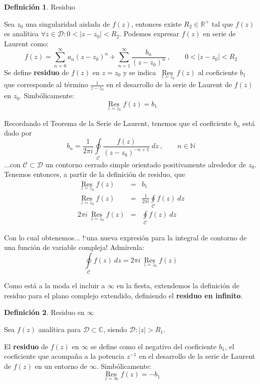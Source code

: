 \documentclass[12pt]{article}
\theoremstyle{definition}
\newtheorem{definition}{Definici\'on}[section]
\theoremstyle{theorem}
\theoremstyle{corolary}
\theoremstyle{method}
\DeclareMathOperator*{\Res}{Res}
\begin{document}
\colorbox{gray!40!white!80}{\parbox{\linewidth}{
\theoremstyle{definition}
\begin{definition}{Residuo}

Sea $z_0$ una singularidad aislada de $f(z)$, entonces existe $R_2\in \mathbb{R}^+$ tal que $f(z)$ es anal\'itica $\forall z \in\mathcal{D}: 0<|z-z_0|<R_2$. Podemos expresar $f(z)$ en serie de Laurent como: $$f(z)=\sum\limits_{n=0}^{\infty}a_n(z-z_0)^n + \sum\limits_{n=1}^{\infty}\frac{b_n}{(z-z_0)^n}\ ,\qquad 0<|z-z_0|<R_2$$
Se define \textbf{residuo} de $f(z)$ en $z=z_0$ y se indica $\Res\limits_{\ z=z_0}f(z)$ al coeficiente $b_1$ que corresponde al t\'ermino $\displaystyle \frac{1}{z-z_0}$ en el desarrollo de la serie de Laurent de $f(z)$ en $z_0$. Simb\'olicamente: $$\Res\limits_{\ z=z_0}f(z) = b_1$$

\end{definition}}}
\linebreak
\linebreak

Recordando el Teorema de la Serie de Laurent, tenemos que el coeficiente $b_n$ est\'a dado por $$b_n=\frac{1}{2\pi i} \oint\limits_{\mathcal{C}}\frac{f(z)}{(z-z_0)^{-n+1}}\ dz\ ,\qquad n\in \mathbb{N}$$
...con $\mathcal{C}\subset \mathcal{D}$ un contorno cerrado simple orientado positivamente alrededor de $z_0$. Tenemos entonces, a partir de la definici\'on de residuo, que
\begin{eqnarray*}
\Res\limits_{\ z=z_0}f(z) &=& b_1\\
\Res\limits_{\ z=z_0}f(z) &=& \frac{1}{2\pi i}\oint\limits_{\mathcal{C}}f(z)\ dz\\
2\pi i\Res\limits_{\ z=z_0}f(z)&=& \oint\limits_{\mathcal{C}}f(z)\ dz  
\end{eqnarray*}

\label{integral} Con lo cual obtenemos... !`una nueva expresi\'on para la integral de contorno de una funci\'on de variable compleja! Adm\'irenla: $$\oint\limits_{\mathcal{C}}f(z)\ dz = 2\pi i\Res\limits_{\ z=z_0}f(z)$$

Como est\'a a la moda el incluir a $\infty$ en la fiesta, extendemos la definici\'on de residuo para el plano complejo extendido, definiendo el \textbf{residuo en infinito}.\\

\colorbox{gray!40!white!80}{\parbox{\linewidth}{
\theoremstyle{definition}
\begin{definition}{Residuo en $\infty$}

Sea $f(z)$ anal\'itica para $\mathcal{D}\subset \mathbb{C}$, siendo $\mathcal{D}:|z|>R_1$.

El \textbf{residuo} de $f(z)$ en $\infty$ se define como el negativo del coeficiente $b_1$, el coeficiente que acompa\~na a la potencia $z^{-1}$ en el desarrollo de la serie de Laurent de $f(z)$ en un entorno de $\infty$. Simb\'olicamente: $$\Res\limits_{\ z=\infty}f(z) = -b_1$$
\end{definition}}}
\linebreak
\end{document}
